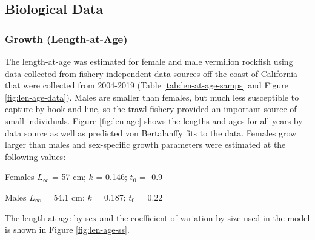 \documentclass[11pt,
  english,
  a4paper,
]{article}
\begin{document}
\hypertarget{biological-data}{%
\subsection{Biological Data}\label{biological-data}}

\leavevmode\tagmcend\tagstructend


\hypertarget{growth-length-at-age}{%
\subsubsection{Growth (Length-at-Age)}\label{growth-length-at-age}}

\leavevmode\tagmcend\tagstructend


The length-at-age was estimated for female and male vermilion rockfish using data collected from fishery-independent data sources off the coast of California that were collected from 2004-2019 (Table \ref{tab:len-at-age-samps} and Figure \ref{fig:len-age-data}). Males are smaller than females, but much less susceptible to capture by hook and line, so the trawl fishery provided an important source of small individuals. Figure \ref{fig:len-age} shows the lengths and ages for all years by data source as well as predicted von Bertalanffy fits to the data. Females grow larger than males and sex-specific growth parameters were estimated at the following values:

\leavevmode\tagmcend\tagstructend\par

\begin{centering}

Females $L_{\infty}$ = 57 cm; $k$ = 0.146; $t_0$ = -0.9

Males $L_{\infty}$ = 54.1 cm; $k$ = 0.187; $t_0$ = 0.22

\end{centering}

\vspace{0.5cm}


The length-at-age by sex and the coefficient of variation by size used in the model is shown in Figure \ref{fig:len-age-ss}.

\leavevmode\tagmcend\tagstructend\par

\end{document}
